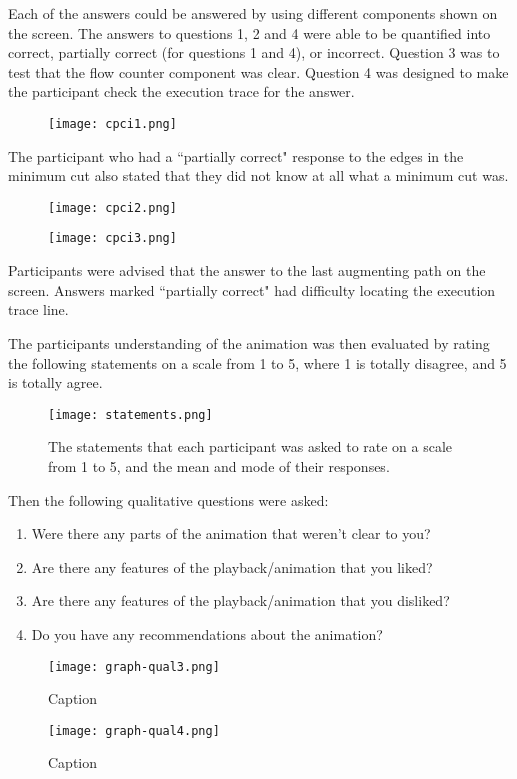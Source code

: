 \documentclass{l4proj}
\begin{document}
Each of the answers could be answered by using different components shown on the screen. The answers to questions 1, 2 and 4 were able to be quantified into correct, partially correct (for questions 1 and 4), or incorrect. Question 3 was to test that the flow counter component was clear. Question 4 was designed to make the participant check the execution trace for the answer.
\begin{figure}[h]
    \centering
    \texttt{[image: cpci1.png]}
    \label{fig:my_label}
\end{figure}

The participant who had a ``partially correct" response to the edges in the minimum cut also stated that they did not know at all what a minimum cut was.

\begin{figure}[h]
    \centering
    \texttt{[image: cpci2.png]}
    \label{fig:my_label}
\end{figure}
\begin{figure}[h]
    \centering
    \texttt{[image: cpci3.png]}
    \label{fig:my_label}
\end{figure}
Participants were advised that the answer to the last augmenting path on the screen. Answers marked ``partially correct" had difficulty locating the execution trace line.

\newpage
The participants understanding of the animation was then evaluated by rating the following statements on a scale from 1 to 5, where 1 is totally disagree, and 5 is totally agree.

\begin{figure}[h]
    \centering
    \texttt{[image: statements.png]}
    \caption{The statements that each participant was asked to rate on a scale from 1 to 5, and the mean and mode of their responses.}
    \label{fig:my_label}
\end{figure}

Then the following qualitative questions were asked:
\begin{enumerate}[noitemsep]
    \item Were there any parts of the animation that weren’t clear to you?
    \item Are there any features of the playback/animation that you liked?
    \item Are there any features of the playback/animation that you disliked?
    \item Do you have any recommendations about the animation?
\end{enumerate}
\begin{figure}[h]
    \centering
    \texttt{[image: graph-qual3.png]}
    \caption{Caption}
    \label{fig:my_label}
\end{figure}
\begin{figure}[h]
    \centering
    \texttt{[image: graph-qual4.png]}
    \caption{Caption}
    \label{fig:my_label}
\end{figure}
\end{document}
